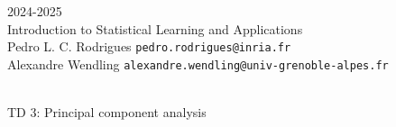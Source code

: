 \begin{flushleft}
 \hfill {} 2024-2025 \\
Introduction to Statistical Learning and Applications \\
Pedro L. C. Rodrigues   \hfill  \texttt{pedro.rodrigues@inria.fr} \\
Alexandre Wendling \hfill \texttt{alexandre.wendling@univ-grenoble-alpes.fr } \\

\HRuleTop\\
\begin{center}
\Large{TD 3: Principal component analysis}
\end{center}
\HRuleBottom
\end{flushleft}
